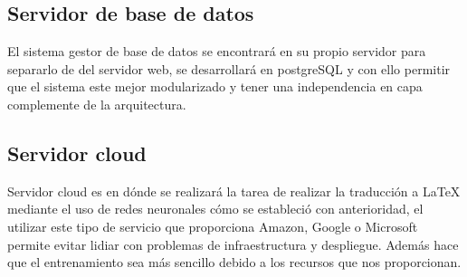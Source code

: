 \subsection{Servidor de base de datos}
El sistema gestor de base de datos se encontrará en su propio servidor para separarlo de del servidor web, se desarrollará en postgreSQL y con ello permitir que el sistema este mejor modularizado y tener una independencia en capa complemente de la arquitectura.
\subsection{Servidor cloud}
Servidor cloud es en dónde se realizará la tarea de realizar la traducción a \LaTeX{}  mediante el uso de redes neuronales cómo se estableció con anterioridad, el utilizar este tipo de servicio que proporciona Amazon, Google o Microsoft permite evitar lidiar con problemas de infraestructura y despliegue. Además hace que el entrenamiento sea más sencillo debido a los recursos que  nos proporcionan.